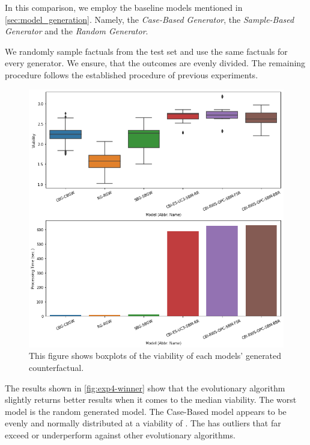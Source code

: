 \documentclass[./../../paper.tex]{subfiles}
\begin{document}
In this comparison, we employ the baseline models mentioned in \autoref{sec:model_generation}. Namely, the \emph{Case-Based Generator}, the \emph{Sample-Based Generator} and the \emph{Random Generator}. 

We randomly sample  factuals from the test set and use the same factuals for every generator. We ensure, that the outcomes are evenly divided. The remaining procedure follows the established procedure of previous experiments.

\begin{figure}[htbp]
    \centering
    \includegraphics[width=\textwidth]{figures/generated/exp4_winner_overall.png}
    \caption{This figure shows boxplots of the viability of each models' generated counterfactual.}
    \label{fig:exp4-winner}
\end{figure}

\noindent The results shown in \autoref{fig:exp4-winner} show that the evolutionary algorithm  slightly returns better results when it comes to the median viability. The worst model is the random generated model. The Case-Based model appears to be evenly and normally distributed at a viability of . The  has outliers that far exceed or underperform against other evolutionary algorithms. 
\end{document}
